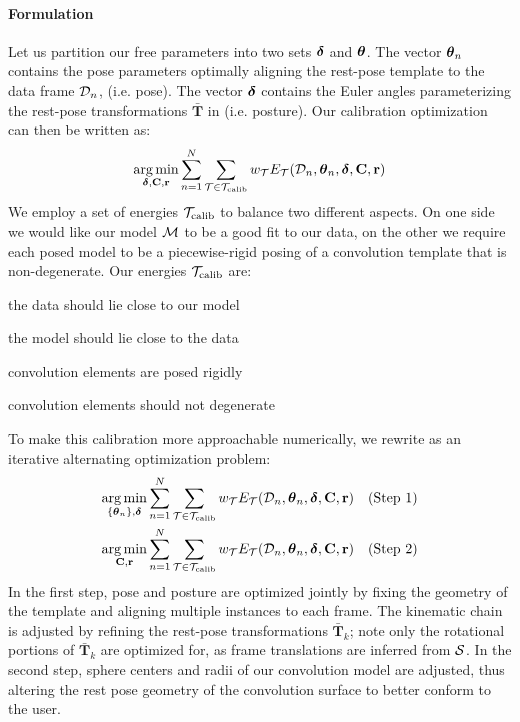 \paragraph{Formulation}
Let us partition our free parameters into two sets $\boldsymbol{\delta}$ and $\boldsymbol{\theta}$. 
The vector $\boldsymbol{\theta}_n$ contains the pose parameters optimally aligning the rest-pose template to the data frame $\mathcal{D}_n$, (i.e. pose). 
The vector $\boldsymbol{\delta}$ contains the Euler angles parameterizing the rest-pose transformations $\mathbf{\bar{T}}$ in  (i.e. posture).
% 
Our calibration optimization can then be written as:
\begin{eqnarray}
\operatorname*{arg\,min}_{\boldsymbol{\delta}, \mathbf{C}, \mathbf{r}}
\sum_{n=1}^N 
\sum_{\mathcal{T} \in {\mathcal{T}_\text{calib}}} 
w_\mathcal{T} E_\mathcal{T}(\mathcal{D}_n, \boldsymbol{\theta}_n, \boldsymbol{\delta}, \mathbf{C}, \mathbf{r})
\label{eq:calibration}
\end{eqnarray}
% 
We employ a set of energies ${\mathcal{T}_\text{calib}}$ to balance two different aspects. On one side we would like our model $\mathcal{M}$ to be a good fit to our data, on the other we require each posed model to be a piecewise-rigid posing of a convolution template that is non-degenerate. Our energies ${\mathcal{T}_\text{calib}}$ are:
% 
\begin{description}[labelsep=0em,labelwidth=.4in,labelindent=1cm]
\item[d2m] the data should lie close to our model
\item[m2d] the model should lie close to the data
\item[rigid] convolution elements are posed rigidly
\item[valid] convolution elements should not degenerate
\end{description}
% 
To make this calibration more approachable numerically, we rewrite  as an iterative alternating optimization problem:
% 
\begin{eqnarray}
\operatorname*{arg\,min}_{{\{\boldsymbol{\theta}_n\}},\boldsymbol{\delta}} 
\sum_{n=1}^N 
\sum_{\mathcal{T} \in {\mathcal{T}_\text{calib}}}
w_\mathcal{T} E_\mathcal{T}(\mathcal{D}_n, \boldsymbol{\theta}_n, \boldsymbol{\delta}, \mathbf{C}, \mathbf{r}) 
&& \text{(Step 1)}
\label{eq:step1}
\\
\operatorname*{arg\,min}_{\mathbf{C}, \mathbf{r}} 
\sum_{n=1}^N 
\sum_{\mathcal{T} \in {\mathcal{T}_\text{calib}}}
w_\mathcal{T} E_\mathcal{T}(\mathcal{D}_n, \boldsymbol{\theta}_n, \boldsymbol{\delta}, \mathbf{C}, \mathbf{r})
&& \text{(Step 2)}
\label{eq:step2}
\end{eqnarray}
% 
In the first step, pose and posture are optimized jointly by fixing the geometry of the template and aligning multiple instances to each frame. The kinematic chain is adjusted by refining the rest-pose transformations $\mathbf{\bar{T}}_k$; note only the rotational portions of $\mathbf{\bar{T}}_k$ are optimized for, as frame translations are inferred from $\mathcal{S}$. In the second step, sphere centers and radii of our convolution model are adjusted, thus altering the rest pose geometry of the convolution surface to better conform to the user.

